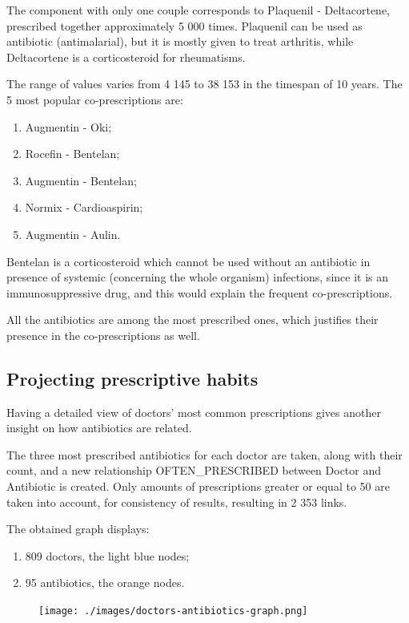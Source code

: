 The component with only one couple corresponds to Plaquenil - Deltacortene, prescribed together approximately 5 000 times. Plaquenil can be used as antibiotic (antimalarial), but it is mostly given to treat arthritis, while Deltacortene is a corticosteroid for rheumatisms. 

The range of values varies from 4 145 to 38 153 in the timespan of 10 years. The 5 most popular co-prescriptions are:
\begin{enumerate}
	\item Augmentin - Oki;
	\item Rocefin - Bentelan;
	\item Augmentin - Bentelan;
	\item Normix - Cardioaspirin;
	\item Augmentin - Aulin.
\end{enumerate}

Bentelan is a corticosteroid which cannot be used without an antibiotic in presence of systemic (concerning the whole organism) infections\cite{bentelan}, since it is an immunosuppressive drug, and this would explain the frequent co-prescriptions.

All the antibiotics are among the most prescribed ones, which justifies their presence in the co-prescriptions as well.

\subsection{Projecting prescriptive habits}
Having a detailed view of doctors' most common prescriptions gives another insight on how antibiotics are related.

The three most prescribed antibiotics for each doctor are taken, along with their count, and a new relationship OFTEN\_PRESCRIBED between Doctor and Antibiotic is created. Only amounts of prescriptions greater or equal to 50 are taken into account, for consistency of results, resulting in 2 353 links.

The obtained graph displays:
\begin{enumerate}
	\item 809 doctors, the light blue nodes;
	\item 95 antibiotics, the orange nodes.
\end{enumerate}

\begin{figure}[h]
	\centering
	\texttt{[image: ./images/doctors-antibiotics-graph.png]}
\end{figure}

